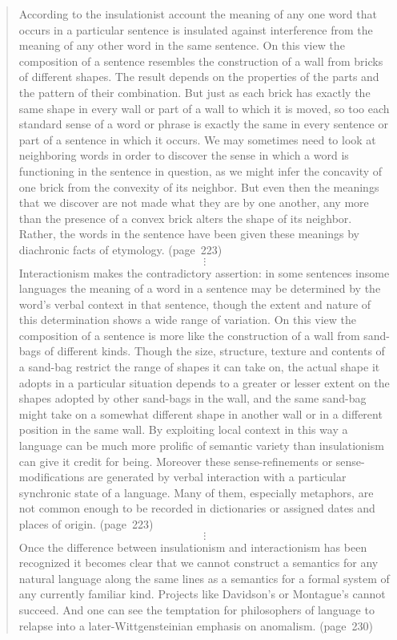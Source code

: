 \begin{quote}

According to the insulationist account the meaning of any one word that occurs in a particular sentence is insulated against interference from the meaning of any other word in the same sentence. On this view the composition of a sentence resembles the construction of a wall from bricks of different shapes. The result depends on the properties of the parts and the pattern of their combination. But just as each brick has exactly the same shape in every wall or part of a wall to which it is moved, so too each standard sense of a word or phrase is exactly the same in every sentence or part of a sentence in which it occurs. We may sometimes need to look at neighboring words in order to discover the sense in which a word is functioning in the sentence in question, as we might infer the concavity of one brick from the convexity of its neighbor. But even then the meanings that we discover are not made what they are by one another, any more than the presence of a convex brick alters the shape of its neighbor. Rather, the words in the sentence have been given these meanings by diachronic facts of etymology. (page~223)
\[\vdots\]
Interactionism makes the contradictory assertion: in some sentences in\linebreak some languages the meaning of a word in a sentence may be determined by the word's verbal context in that sentence, though the extent and nature of this determination shows a wide range of variation. On this view the composition of a sentence is more like the construction of a wall from sand-bags of different kinds. Though the size, structure, texture and contents of a sand-bag restrict the range of shapes it can take on, the actual shape it adopts in a particular situation depends to a greater or lesser extent on the shapes adopted by other sand-bags in the wall, and the same sand-bag might take on a somewhat different shape in another wall or in a different position in the same wall. By exploiting local context in this way a language can be much more prolific of semantic variety than insulationism can give it credit for being. Moreover these sense-refinements or sense-modifications are generated by verbal interaction with a particular synchronic state of a language. Many of them, especially metaphors, are not common enough to be recorded in dictionaries or assigned dates and places of origin. (page~223)
\[\vdots\]
Once the difference between insulationism and interactionism has been recognized it becomes clear that we cannot construct a semantics for any natural language along the same lines as a semantics for a formal system of any currently familiar kind. Projects like Davidson's or Montague's cannot succeed. And one can see the temptation for philosophers of language to relapse into a later-Wittgensteinian emphasis on anomalism. (page~230)

\end{quote}
